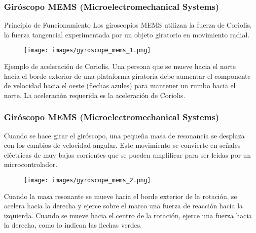 \begin{frame}
    \frametitle{Giróscopo MEMS (Microelectromechanical Systems)}
    \footnotesize
    \begin{block}{Principio de Funcionamiento}
        Los giroscopios MEMS utilizan la fuerza de Coriolis, la fuerza tangencial experimentada por un objeto giratorio en movimiento radial.
    \end{block}


    \begin{figure}[!h]
        \centering
        \texttt{[image: images/gyroscope\_mems\_1.png]}
    \end{figure}

    Ejemplo de aceleración de Coriolis. Una persona que se mueve hacia el norte hacia el borde exterior de una plataforma giratoria debe aumentar el componente de velocidad hacia el oeste (flechas azules) para mantener un rumbo hacia el norte. La aceleración requerida es la aceleración de Coriolis.



\end{frame}

\begin{frame}
    \frametitle{Giróscopo MEMS (Microelectromechanical Systems)}
    \footnotesize

    Cuando se hace girar el giróscopo, una pequeña masa de resonancia se desplaza con los cambios de velocidad angular. Este movimiento se convierte en señales eléctricas de muy bajas corrientes que se pueden amplificar para ser leídas por un microcontrolador.

    \begin{figure}[!h]
        \centering
        \texttt{[image: images/gyroscope\_mems\_2.png]}
    \end{figure}

    Cuando la masa resonante se mueve hacia el borde exterior de la rotación, se acelera hacia la derecha y ejerce sobre el marco una fuerza de reacción hacia la izquierda. Cuando se mueve hacia el centro de la rotación, ejerce una fuerza hacia la derecha, como lo indican las flechas verdes.
\end{frame}

